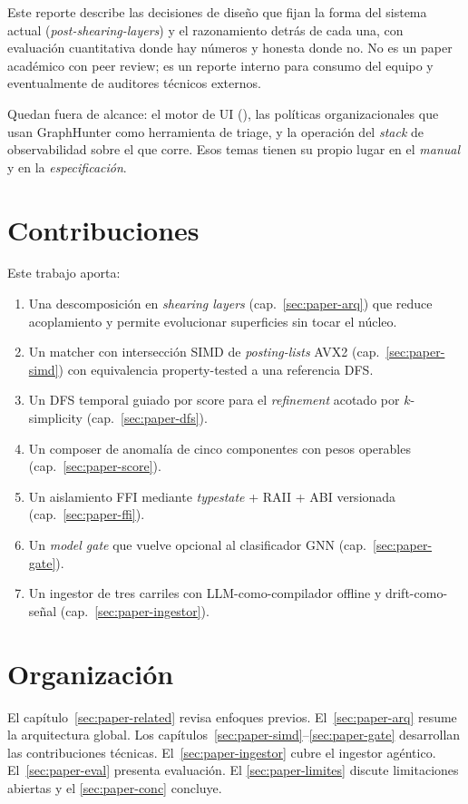Este reporte describe las decisiones de diseño que fijan la forma
del sistema actual (\emph{post-shearing-layers}) y el razonamiento
detrás de cada una, con evaluación cuantitativa donde hay números y
honesta donde no. No es un paper académico con peer review; es un
reporte interno para consumo del equipo y eventualmente de
auditores técnicos externos.

Quedan fuera de alcance: el motor de UI
(), las políticas organizacionales que usan
GraphHunter como herramienta de triage, y la operación del
\emph{stack} de observabilidad sobre el que corre. Esos temas
tienen su propio lugar en el \emph{manual} y en la
\emph{especificación}.

\section{Contribuciones}

Este trabajo aporta:

\begin{enumerate}
    \item Una descomposición en \emph{shearing layers}
    (cap.~\ref{sec:paper-arq}) que reduce acoplamiento y permite
    evolucionar superficies sin tocar el núcleo.
    \item Un matcher con intersección SIMD de \emph{posting-lists}
    AVX2 (cap.~\ref{sec:paper-simd}) con equivalencia
    property-tested a una referencia DFS.
    \item Un DFS temporal guiado por score para el
    \emph{refinement} acotado por $k$-simplicity
    (cap.~\ref{sec:paper-dfs}).
    \item Un composer de anomalía de cinco componentes con pesos
    operables (cap.~\ref{sec:paper-score}).
    \item Un aislamiento FFI mediante \emph{typestate} + RAII +
    ABI versionada (cap.~\ref{sec:paper-ffi}).
    \item Un \emph{model gate} que vuelve opcional al clasificador
    GNN (cap.~\ref{sec:paper-gate}).
    \item Un ingestor de tres carriles con LLM-como-compilador
    offline y drift-como-señal (cap.~\ref{sec:paper-ingestor}).
\end{enumerate}

\section{Organización}

El capítulo~\ref{sec:paper-related} revisa enfoques previos.
El~\ref{sec:paper-arq} resume la arquitectura global. Los
capítulos~\ref{sec:paper-simd}--\ref{sec:paper-gate} desarrollan las
contribuciones técnicas. El~\ref{sec:paper-ingestor} cubre el
ingestor agéntico. El~\ref{sec:paper-eval} presenta evaluación. El
\ref{sec:paper-limites} discute limitaciones abiertas y el
\ref{sec:paper-conc} concluye.
